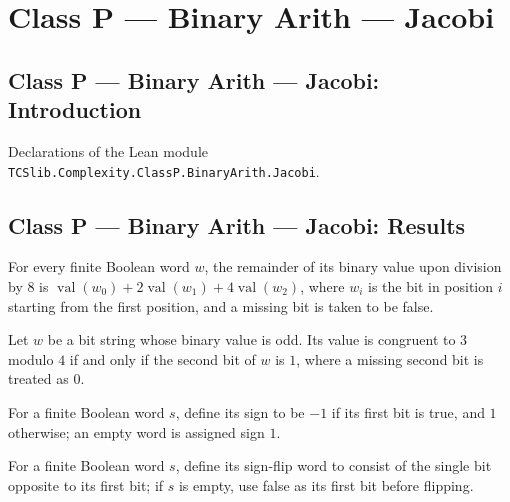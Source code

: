 \section{Class P --- Binary Arith --- Jacobi}
\subsection*{Class P --- Binary Arith --- Jacobi: Introduction}

Declarations of the Lean module \texttt{TCSlib.Complexity.ClassP.BinaryArith.Jacobi}.

\subsection*{Class P --- Binary Arith --- Jacobi: Results}

\begin{theorem}
\label{Complexity.BinArith.bitsVal_mod_eight}
\leanok
{}
For every finite Boolean word $w$, the remainder of its binary value upon division by
$8$ is $\operatorname{val}(w_0)+2\operatorname{val}(w_1)+4\operatorname{val}(w_2)$,
where $w_i$ is the bit in position $i$ starting from the first position, and a missing
bit is taken to be false.
\end{theorem}

\begin{theorem}
\label{Complexity.BinArith.mod_four_eq_three_iff}
\leanok
{}
Let $w$ be a bit string whose binary value is odd. Its value is congruent to $3$ modulo
$4$ if and only if the second bit of $w$ is $1$, where a missing second bit is treated
as $0$.
\end{theorem}

\begin{definition}
\label{Complexity.BinArith.signOf}
\leanok
For a finite Boolean word $s$, define its sign to be $-1$ if its first bit is true, and
$1$ otherwise; an empty word is assigned sign $1$.
\end{definition}

\begin{definition}
\label{Complexity.BinArith.flipSign}
\leanok
For a finite Boolean word $s$, define its sign-flip word to consist of the single bit
opposite to its first bit; if $s$ is empty, use false as its first bit before flipping.
\end{definition}

